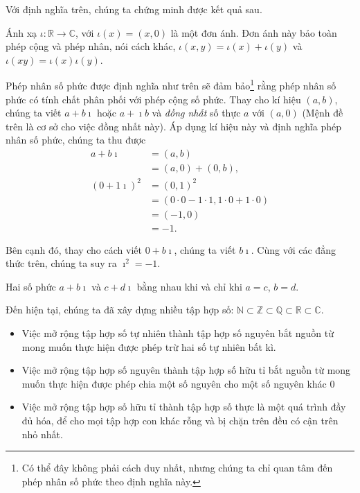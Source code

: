 Với định nghĩa trên, chúng ta chứng minh được kết quả sau.
\begin{proposition}
	Ánh xạ $\iota: \mathbb{R}\to \mathbb{C}$, với $\iota(x) = (x, 0)$ là một đơn ánh. Đơn ánh này bảo toàn phép cộng và phép nhân, nói cách khác, $\iota(x, y) = \iota(x) + \iota(y)$ và $\iota(xy) = \iota(x)\iota(y)$.
\end{proposition}

Phép nhân số phức được định nghĩa như trên sẽ đảm bảo\footnote{Có thể đây không phải cách duy nhất, nhưng chúng ta chỉ quan tâm đến phép nhân số phức theo định nghĩa này.} rằng phép nhân số phức có tính chất phân phối với phép cộng số phức. Thay cho kí hiệu $(a, b)$, chúng ta viết $a + b\imath$ hoặc $a + \imath b$ và \textit{đồng nhất} số thực $a$ với $(a, 0)$ (Mệnh đề trên là cơ sở cho việc đồng nhất này). Áp dụng kí hiệu này và định nghĩa phép nhân số phức, chúng ta thu được
\[
	\begin{split}
		a + b\imath & = (a, b) \\
		& = (a, 0) + (0, b), \\
		{(0 + 1\imath)}^{2} & = {(0, 1)}^{2} \\
		& = (0\cdot 0 - 1\cdot 1, 1\cdot 0 + 1\cdot 0) \\
		& = (-1, 0) \\
		& = -1.
	\end{split}
\]

Bên cạnh đó, thay cho cách viết $0 + b\imath$, chúng ta viết $b\imath$. Cùng với các đẳng thức trên, chúng ta suy ra $\imath^{2} = -1$.

\begin{theorem}
	Hai số phức $a + b\imath$ và $c + d\imath$ bằng nhau khi và chỉ khi $a = c$, $b = d$.
\end{theorem}

Đến hiện tại, chúng ta đã xây dựng nhiều tập hợp số: $\mathbb{N} \subset \mathbb{Z} \subset \mathbb{Q} \subset \mathbb{R} \subset \mathbb{C}$.
\begin{itemize}
	\item Việc mở rộng tập hợp số tự nhiên thành tập hợp số nguyên bắt nguồn từ mong muốn thực hiện được phép trừ hai số tự nhiên bất kì.
	\item Việc mở rộng tập hợp số nguyên thành tập hợp số hữu tỉ bắt nguồn từ mong muốn thực hiện được phép chia một số nguyên cho một số nguyên khác $0$
	\item Việc mở rộng tập hợp số hữu tỉ thành tập hợp số thực là một quá trình đầy đủ hóa, để cho mọi tập hợp con khác rỗng và bị chặn trên đều có cận trên nhỏ nhất.
\end{itemize}

